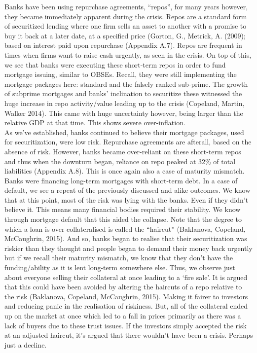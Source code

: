 \documentclass[11pt, english]{article}
\begin{document}
	Banks have been using repurchase agreements, ``repos'', for many years however, they became immediately apparent during the crisis. Repos are a standard form of securitized lending where one firm sells an asset to another with a promise to buy it back at a later date, at a specified price (Gorton, G., Metrick, A. (2009); based on interest paid upon repurchase (Appendix A.7). Repos are frequent in times when firms want to raise cash urgently, as seen in the crisis. On top of this, we see that banks were executing these short-term repos in order to fund mortgage issuing, similar to OBSEs. Recall, they were still implementing the mortgage packages here: standard and the falsely ranked sub-prime. The growth of subprime mortgages and banks' inclination to securitize these witnessed the huge increase in repo activity/value leading up to the crisis (Copeland, Martin, Walker 2014). This came with huge uncertainty however, being larger than the relative GDP at that time. This shows severe over-inflation.\\

	As we've established, banks continued to believe their mortgage packages, used for securitization, were low risk. Repurchase agreements are afterall, based on the absence of risk. However, banks became over-reliant on these short-term repos and thus when the downturn began, reliance on repo peaked at 32\% of total liabilities (Appendix A.8). This is once again also a case of maturity mismatch. Banks were financing long-term mortgages with short-term debt. In a case of default, we see a repeat of the previously discussed and alike outcomes. We know that at this point, most of the risk was lying with the banks. Even if they didn't believe it. This means many financial bodies required their stability. We know through mortgage default that this aided the collapse. Note that the degree to which a loan is over collateralised is called the ``haircut'' (Baklanova, Copeland, McCaughrin, 2015). And so, banks began to realise that their securitization was riskier than they thought and people began to demand their money back urgently but if we recall their maturity mismatch, we know that they don't have the funding/ability as it is lent long-term somewhere else. Thus, we observe just about everyone selling their collateral at once leading to a `fire sale'. It is argued that this could have been avoided by altering the haircuts of a repo relative to the risk (Baklanova, Copeland, McCaughrin, 2015). Making it fairer to investors and reducing panic in the realisation of riskiness. But, all of the collateral ended up on the market at once which led to a fall in prices primarily as there was a lack of buyers due to these trust issues. If the investors simply accepted the risk at an adjusted haircut, it's argued that there wouldn't have been a crisis. Perhaps just a decline.\\
\end{document}
